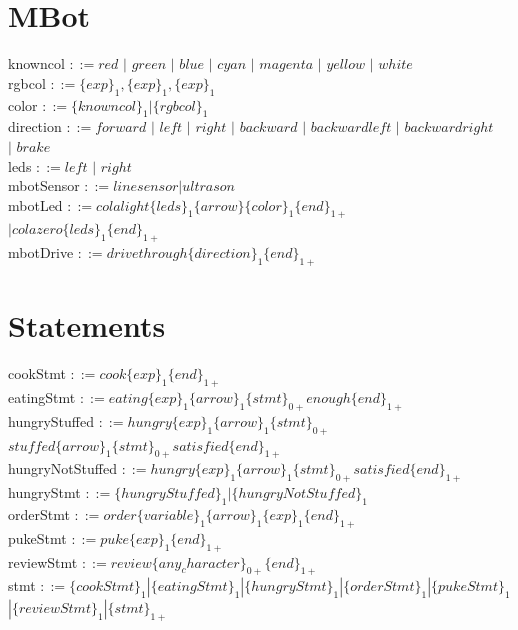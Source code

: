 \documentclass[12pt,a4paper]{report}
\begin{document}
\section{MBot}
knowncol $::= red$ $|$ $green$ $|$ $blue$ $|$ $cyan$ $|$ $magenta$ $|$ $yellow$ $|$ $white$\\
rgbcol $::= \{exp\}_{1}, \{exp\}_{1}, \{exp\}_{1}$\\
color $::= \{knowncol\}_{1} | \{rgbcol\}_{1}$\\
direction $::= forward$ $|$ $left$ $|$ $right$ $|$ $backward$ $|$ $backwardleft$ $|$ $backwardright$ \\
\indent\indent\indent$|$ $brake$\\
leds $::= left$ $|$ $right$\\
mbotSensor $::= linesensor | ultrason$\\
mbotLed $::= colalight \{leds\}_{1} \{arrow\} \{color\}_{1} \{end\}_{1+}$\\
\indent\indent\indent$| colazero \{leds\}_{1} \{end\}_{1+}$\\
mbotDrive $::= drivethrough \{direction\}_{1} \{end\}_{1+}$\\

\section{Statements}
cookStmt $::= cook \{exp\}_{1} \{end\}_{1+}$\\
eatingStmt $::= eating \{exp\}_{1} \{arrow\}_{1} \{stmt\}_{0+} enough \{end\}_{1+}$\\
hungryStuffed $::= hungry \{exp\}_{1} \{arrow\}_{1} \{stmt\}_{0+}$\\
\indent\indent\indent\indent $stuffed \{arrow\}_{1} \{stmt\}_{0+} satisfied \{end\}_{1+}$\\
hungryNotStuffed $::= hungry \{exp\}_{1} \{arrow\}_{1} \{stmt\}_{0+} satisfied \{end\}_{1+}$\\
hungryStmt $::= \{hungryStuffed\}_{1} | \{hungryNotStuffed\}_{1}$\\
orderStmt $::= order \{variable\}_{1} \{arrow\}_{1} \{exp\}_{1} \{end\}_{1+}$\\
pukeStmt $::= puke \{exp\}_{1} \{end\}_{1+}$\\
reviewStmt $::= review \{any_character\}_{0+} \{end\}_{1+}$\\
stmt $::= \{cookStmt\}_{1} | \{eatingStmt\}_{1} | \{hungryStmt\}_{1} | \{orderStmt\}_{1} | \{pukeStmt\}_{1}$\\
\indent\indent$| \{reviewStmt\}_{1} | \{stmt\}_{1+}$\\
\end{document}
